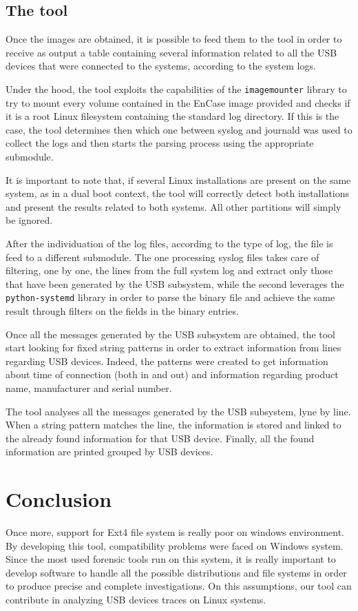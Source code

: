 \documentclass[a4paper]{article}
\begin{document}
\subsection{The tool}\label{sec:tool}
Once the images are obtained, it is possible to feed them to the tool in order
to receive as output a table containing several information related to all the
USB devices that were connected to the systems, according to the system logs.

Under the hood, the tool exploits the capabilities of the \texttt{imagemounter}
library to try to mount every volume contained in the EnCase image provided and
checks if it is a root Linux filesystem containing the standard log directory.
If this is the case, the tool determines then which one between syslog and
journald was used to collect the logs and then starts the parsing process using
the appropriate submodule.

It is important to note that, if several Linux installations are present on the
same system, as in a dual boot context, the tool will correctly detect both
installations and present the results related to both systems. All other
partitions will simply be ignored.

After the individuation of the log files, according to the type of log, the file
is feed to a different submodule. The one processing syslog files takes care of
filtering, one by one, the lines from the full system log and extract only those
that have been generated by the USB subsystem, while the second leverages the
\texttt{python-systemd} library in order to parse the binary file and achieve
the same result through filters on the fields in the binary entries.

Once all the messages generated by the USB subsystem are obtained, the tool
start looking for fixed string patterns in order to extract information from
lines regarding USB devices. Indeed, the patterns were created to get
information about time of connection (both in and out) and information regarding
product name, manufacturer and serial number.

The tool analyses all the messages generated by the USB subsystem, lyne by line.
When a string pattern matches the line, the information is stored and linked to
the already found information for that USB device. Finally, all the found
information are printed grouped by USB devices.

\section{Conclusion}
\label{sec:concl}
Once more, support for Ext4 file system is really poor on windows environment.
By developing this tool, compatibility problems were faced on Windows system.
Since the most used forensic tools run on this system, it is really important to
develop software to handle all the possible distributions and file systems in
order to produce precise and complete investigations. On this assumptions, our
tool can contribute in analyzing USB devices traces on Linux systems.
\end{document}
